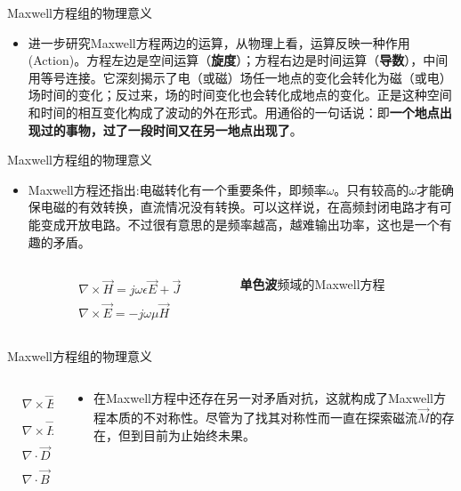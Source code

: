 \documentclass{ctexbeamer}
\begin{document}
\begin{frame}{Maxwell方程组的物理意义}
  \begin{itemize}
    \item 进一步研究Maxwell方程两边的运算，从物理上看，运算反映一种作用(Action)。方程左边是空间运算（\textbf{旋度}）；方程右边是时间运算（\textbf{导数}），中间用等号连接。它深刻揭示了电（或磁）场任一地点的变化会转化为磁（或电）场时间的变化；反过来，场的时间变化也会转化成地点的变化。正是这种空间和时间的相互变化构成了波动的外在形式。用通俗的一句话说：即\textbf{一个地点出现过的事物，过了一段时间又在另一地点出现了}。
  \end{itemize}
\end{frame}

\begin{frame}{Maxwell方程组的物理意义}
\begin{itemize}
  \item Maxwell方程还指出:电磁转化有一个重要条件，即频率$\omega$。只有较高的$\omega$才能确保电磁的有效转换，直流情况没有转换。可以这样说，在高频封闭电路才有可能变成开放电路。不过很有意思的是频率越高，越难输出功率，这也是一个有趣的矛盾。
  \begin{columns}
    \begin{column}{0.4\linewidth}
      \begin{align*}
        & \nabla\times\vec{H} = j\omega\epsilon\vec{E}+\vec{J}\\
        & \nabla\times\vec{E} = -j\omega\mu\vec{H}
      \end{align*}
    \end{column}
    \begin{column}{0.6\linewidth}
      \textbf{单色波}频域的Maxwell方程
    \end{column}
  \end{columns}
\end{itemize}
\end{frame}

\begin{frame}{Maxwell方程组的物理意义}
  \begin{columns}
    \begin{column}{0.4\linewidth}
      \begin{align*}
        &\nabla\times\vec E=-\frac{\partial \vec B}{\partial t}\\
        &\nabla\times\vec H=\vec{J} +\frac{\partial \vec D}{\partial t}\\
        &\nabla\cdot\vec{D}=\rho\\
        &\nabla\cdot\vec{B}=0
      \end{align*}
    \end{column}
    \begin{column}{0.65\linewidth}
      \begin{itemize}
        \item 在Maxwell方程中还存在另一对矛盾对抗，这就构成了Maxwell方程本质的不对称性。尽管为了找其对称性而一直在探索磁流$\vec{M}$的存在，但到目前为止始终未果。
      \end{itemize}
    \end{column}
  \end{columns}
\end{frame}
\end{document}

